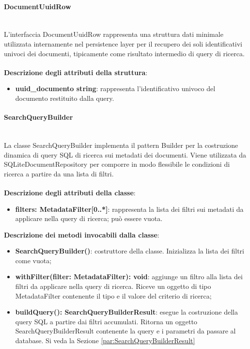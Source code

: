 \documentclass[a4paper,12pt]{article}
\begin{document}
                \paragraph{DocumentUuidRow}\label{par:DocumentUuidRow}\mbox{}\\
                L'interfaccia DocumentUuidRow rappresenta una struttura dati minimale utilizzata internamente nel persistence layer per il recupero dei soli identificativi univoci dei documenti, tipicamente come risultato intermedio di query di ricerca.\\
                \\
                \textbf{Descrizione degli attributi della struttura}:
                \begin{itemize}
                    \item \textbf{uuid\_documento string}: rappresenta l'identificativo univoco del documento restituito dalla query.
                \end{itemize}
 
                \paragraph{SearchQueryBuilder}\label{par:SearchQueryBuilder}\mbox{}\\
                La classe SearchQueryBuilder implementa il pattern Builder per la costruzione dinamica di query SQL di ricerca sui metadati dei documenti. Viene utilizzata da SQLiteDocumentRepository per comporre in modo flessibile le condizioni di ricerca a partire da una lista di filtri.\\
                \\
                \textbf{Descrizione degli attributi della classe}:
                \begin{itemize}
                    \item \textbf{filters: MetadataFilter[0..*]}: rappresenta la lista dei filtri sui metadati da applicare nella query di ricerca; può essere vuota.
                \end{itemize}
 
              \noindent \textbf{Descrizione dei metodi invocabili dalla classe}:
                \begin{itemize}
                    \item \textbf{SearchQueryBuilder()}: costruttore della classe. Inizializza la lista dei filtri come vuota;
                    \item \textbf{withFilter(filter: MetadataFilter): void}: aggiunge un filtro alla lista dei filtri da applicare nella query di ricerca. Riceve un oggetto di tipo MetadataFilter contenente il tipo e il valore del criterio di ricerca;
                    \item \textbf{buildQuery(): SearchQueryBuilderResult}: esegue la costruzione della query SQL a partire dai filtri accumulati. Ritorna un oggetto SearchQueryBuilderResult contenente la query e i parametri da passare al database. Si veda la Sezione \ref{par:SearchQueryBuilderResult}
                \end{itemize}
 
\end{document}
